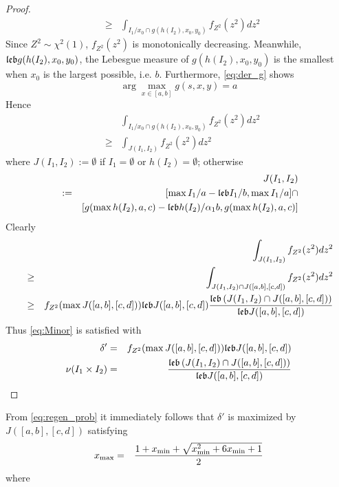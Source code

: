 \documentclass{article}
\theoremstyle{remark}
\begin{document}
\begin{proof}
\begin{eqnarray*}
    &\geq& \int_{I_1/x_0 \cap g(h(I_2), x_0, y_0)} f_{Z^2}(z^2) dz^2
  \end{eqnarray*}
  Since $Z^2 \sim \chi^2(1)$, $f_{Z^2}(z^2)$ is monotonically
  decreasing. Meanwhile, $\mathfrak{leb} g(h(I_2), x_0, y_0)$, the Lebesgue measure
  of $g(h(I_2), x_0, y_0)$ is the smallest when $x_0$ is the
  largest possible, i.e. $b$. Furthermore, \eqref{eq:der_g} shows
  \[
  \arg \max_{x \in [a, b]} g(s, x, y) = a
  \]
  Hence
  \begin{eqnarray*}
    && \int_{I_1/x_0 \cap g(h(I_2), x_0, y_0)} f_{Z^2}(z^2) dz^2 \\
    &\geq& \int_{J(I_1, I_2)} f_{Z^2}(z^2) dz^2           
  \end{eqnarray*}
  where $J(I_1, I_2) := \emptyset$ if $I_1 = \emptyset$ or $h(I_2) =
  \emptyset$; otherwise
  \begin{eqnarray*}
  && J(I_1, I_2) \\
  &:=& [\max I_1/a - \mathfrak{leb} I_1/b, \max I_1/a]
      \cap \\
  && [g(\max h(I_2), a, c) - \mathfrak{leb} h(I_2) /\alpha_1 b, g(\max h(I_2), a, c)]
  \end{eqnarray*}
  Clearly
  \begin{eqnarray*}
    && \int_{J(I_1, I_2)} f_{Z^2}(z^2) dz^2               \\
    &\geq& \int_{J(I_1, I_2) \cap J([a, b], [c, d])} f_{Z^2}(z^2)
           dz^2 \\
    &\geq& f_{Z^2}(\max J([a, b], [c, d])) \mathfrak{leb} J([a, b], [c, d])
           {
           \mathfrak{leb} \left(
           J(I_1, I_2) \cap J([a, b], [c, d])
           \right)
           \over
           \mathfrak{leb} J([a, b], [c, d])
           }
  \end{eqnarray*}
  Thus \eqref{eq:Minor} is satisfied with
  \begin{eqnarray}
    \delta'
    &=&
    f_{Z^2}(\max J([a, b], [c, d])) \mathfrak{leb} J([a, b], [c, d]) \label{eq:regen_prob}\\
    \nu(I_1 \times I_2)
    &=& {
      \mathfrak{leb} \left(
        J(I_1, I_2) \cap J([a, b], [c, d])
      \right)
      \over
      \mathfrak{leb} J([a, b], [c, d])
    } \nonumber
  \end{eqnarray}
\end{proof}
From \eqref{eq:regen_prob} it immediately follows that $\delta'$ is
maximized by $J([a, b], [c ,d])$ satisfying
\begin{eqnarray}
  x_{\text{max}} &=& {
    1 + x_{\text{min}} + \sqrt{x_{\text{min}}^2 + 6 x_{\text{min}} + 1}
    \over
    2
  } \label{eq:maximizing_cond}
\end{eqnarray}
where 
\end{document}
